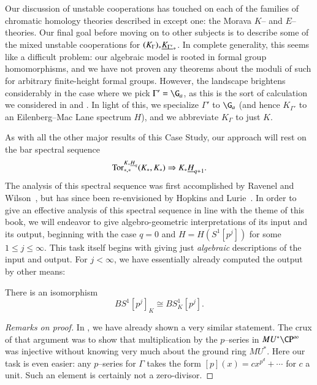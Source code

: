 Our discussion of unstable cooperations has touched on each of the families of chromatic homology theories described in  except one: the Morava $K$-- and $E$--theories.  Our final goal before moving on to other subjects is to describe some of the mixed unstable cooperations for $(K_\Gamma)_* \underline{\smash{K_{\Gamma'}}}_{*}$.  In complete generality, this seems like a difficult problem: our algebraic model is rooted in formal group homomorphisms, and we have not proven any theorems about the moduli of such for arbitrary finite-height formal groups.  However, the landscape brightens considerably in the case where we pick $\Gamma' = \G_a$, as this is the sort of calculation we considered in  and .  In light of this, we specialize $\Gamma'$ to $\G_a$ (and hence $K_{\Gamma'}$ to an Eilenberg--Mac Lane spectrum $H$), and we abbreviate $K_\Gamma$ to just $K$.

As with all the other major results of this Case Study, our approach will rest on the bar spectral sequence \[\operatorname{Tor}^{K_* \underline{\smash{H}}_{q}}_{*, *}(K_*, K_*) \Rightarrow K_* \underline{\smash{H}}_{q+1}.\]  The analysis of this spectral sequence was first accomplished by Ravenel and Wilson~\cite{RavenelWilsonKthyOfEMSpaces}, but has since been re-envisioned by Hopkins and Lurie~\cite[Section 2]{HopkinsLurie}.  In order to give an effective analysis of this spectral sequence in line with the theme of this book, we will endeavor to give algebro-geometric interpretations of its input and its output, beginning with the case $q = 0$ and $H = H(S^1[p^j])$ for some $1 \le j \le \infty$.  This task itself begins with giving just \emph{algebraic} descriptions of the input and output.  For $j < \infty$, we have essentially already computed the output by other means:

\begin{theorem}\label{KtheoryConvertsTorsionToTorsion}
There is an isomorphism \[BS^1[p^j]_K \cong BS^1_K[p^j].\]
\end{theorem}
\begin{proof}[Remarks on proof]
In , we have already shown a very similar statement.  The crux of that argument was to show that multiplication by the $p$--series in $MU^* \CP^\infty$ was injective without knowing very much about the ground ring $MU^*$.  Here our task is even easier: any $p$--series for $\Gamma$ takes the form $[p](x) = c x^{p^d} + \cdots$ for $c$ a unit.  Such an element is certainly not a zero-divisor.
\end{proof}

